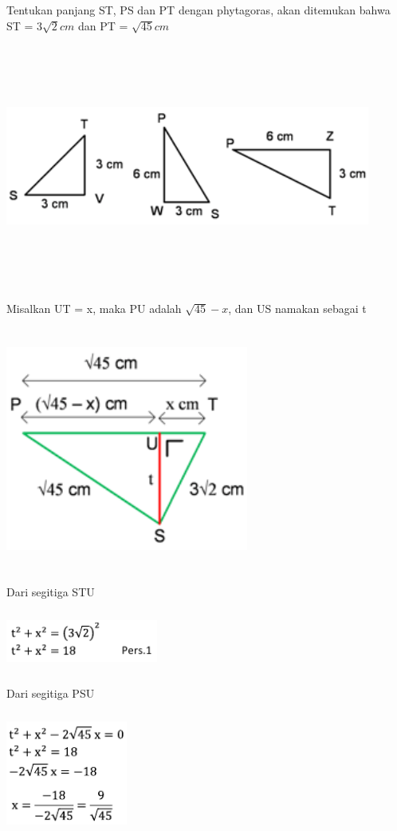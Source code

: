 \documentclass[11pt,fleqn]{book} %
\begin{document}
	
	Tentukan panjang ST, PS dan PT dengan phytagoras, akan ditemukan bahwa ST = $3\sqrt{2}cm$ dan PT = $\sqrt{45}cm$

	\includegraphics[width = 12cm, height= 8cm]{Pictures/dede19.png}
	
	
	Misalkan UT = x, maka PU adalah $\sqrt{45}-x$, dan US namakan sebagai t 

	\includegraphics[width = 8cm, height= 8cm]{Pictures/dede20.png}
	
	Dari segitiga STU 
	
	\includegraphics[width = 5cm, height= 2cm]{Pictures/dede21.png}
	
	Dari segitiga PSU 
	
	\includegraphics[width = 4cm, height= 4cm]{Pictures/dede22.png}
	
\end{document}

